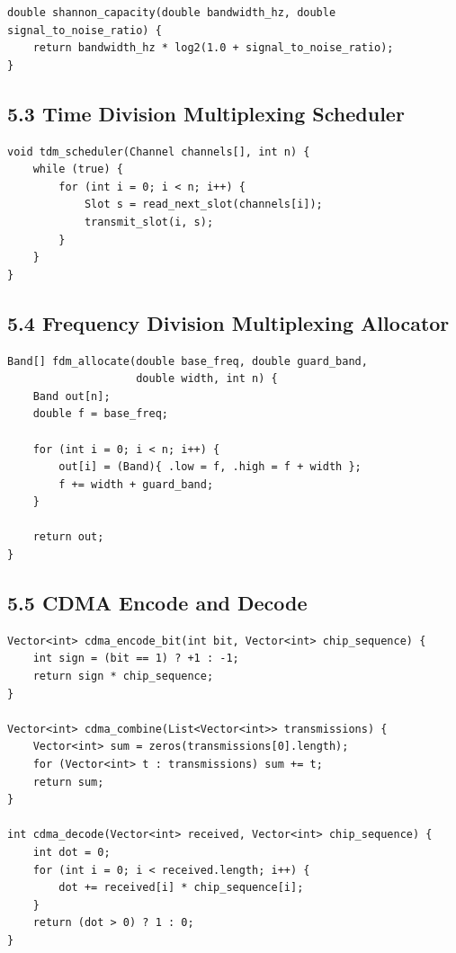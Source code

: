 \documentclass[11pt]{article}
\begin{document}
\begin{verbatim}
double shannon_capacity(double bandwidth_hz, double signal_to_noise_ratio) {
    return bandwidth_hz * log2(1.0 + signal_to_noise_ratio);
}
\end{verbatim}

\subsection{5.3 Time Division Multiplexing
Scheduler}\label{time-division-multiplexing-scheduler}

\begin{verbatim}
void tdm_scheduler(Channel channels[], int n) {
    while (true) {
        for (int i = 0; i < n; i++) {
            Slot s = read_next_slot(channels[i]);
            transmit_slot(i, s);
        }
    }
}
\end{verbatim}

\subsection{5.4 Frequency Division Multiplexing
Allocator}\label{frequency-division-multiplexing-allocator}

\begin{verbatim}
Band[] fdm_allocate(double base_freq, double guard_band,
                    double width, int n) {
    Band out[n];
    double f = base_freq;

    for (int i = 0; i < n; i++) {
        out[i] = (Band){ .low = f, .high = f + width };
        f += width + guard_band;
    }

    return out;
}
\end{verbatim}

\subsection{5.5 CDMA Encode and Decode}\label{cdma-encode-and-decode}

\begin{verbatim}
Vector<int> cdma_encode_bit(int bit, Vector<int> chip_sequence) {
    int sign = (bit == 1) ? +1 : -1;
    return sign * chip_sequence;
}

Vector<int> cdma_combine(List<Vector<int>> transmissions) {
    Vector<int> sum = zeros(transmissions[0].length);
    for (Vector<int> t : transmissions) sum += t;
    return sum;
}

int cdma_decode(Vector<int> received, Vector<int> chip_sequence) {
    int dot = 0;
    for (int i = 0; i < received.length; i++) {
        dot += received[i] * chip_sequence[i];
    }
    return (dot > 0) ? 1 : 0;
}
\end{verbatim}
\end{document}
